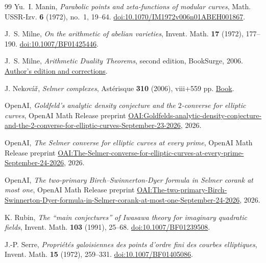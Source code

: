 \begin{thebibliography}{99}
Yu.~I. Manin,
\emph{Parabolic points and zeta-functions of modular curves},
Math. USSR-Izv. \textbf{6} (1972), no.~1, 19--64.
\href{https://doi.org/10.1070/IM1972v006n01ABEH001867}{doi:10.1070/IM1972v006n01ABEH001867}.

J.~S. Milne,
\emph{On the arithmetic of abelian varieties},
Invent. Math. \textbf{17} (1972), 177--190.
\href{https://doi.org/10.1007/BF01425446}{doi:10.1007/BF01425446}.

J.~S. Milne,
\emph{Arithmetic Duality Theorems}, second edition,
BookSurge, 2006.
\href{https://www.jmilne.org/math/Books/adt.html}{Author's edition and corrections}.

J. Nekov\'a\v{r},
\emph{Selmer complexes},
Ast\'erisque \textbf{310} (2006), viii+559 pp.
\href{https://www.numdam.org/item/AST_2006__310__R1_0/}{Book}.

OpenAI,
\emph{Goldfeld's analytic density conjecture and the $2$-converse for elliptic curves},
OpenAI Math Release preprint
\href{https://github.com/openai/math/blob/main/preprints/Goldfelds-analytic-density-conjecture-and-the-2-converse-for-elliptic-curves-September-23-2026/paper.pdf}{OAI:Goldfelds-analytic-density-conjecture-and-the-2-converse-for-elliptic-curves-September-23-2026},
2026.

OpenAI,
\emph{The Selmer converse for elliptic curves at every prime},
OpenAI Math Release preprint
\href{https://github.com/openai/math/blob/main/preprints/The-Selmer-converse-for-elliptic-curves-at-every-prime-September-24-2026/main.pdf}{OAI:The-Selmer-converse-for-elliptic-curves-at-every-prime-September-24-2026},
2026.

OpenAI,
\emph{The two-primary Birch--Swinnerton-Dyer formula in Selmer corank at most one},
OpenAI Math Release preprint
\href{https://github.com/openai/math/blob/main/preprints/The-two-primary-Birch-Swinnerton-Dyer-formula-in-Selmer-corank-at-most-one-September-24-2026/paper.pdf}{OAI:The-two-primary-Birch-Swinnerton-Dyer-formula-in-Selmer-corank-at-most-one-September-24-2026},
2026.

K. Rubin,
\emph{The ``main conjectures'' of Iwasawa theory
for imaginary quadratic fields},
Invent. Math. \textbf{103} (1991), 25--68.
\href{https://doi.org/10.1007/BF01239508}{doi:10.1007/BF01239508}.

J.-P. Serre,
\emph{Propri\'et\'es galoisiennes des points d'ordre fini
des courbes elliptiques},
Invent. Math. \textbf{15} (1972), 259--331.
\href{https://doi.org/10.1007/BF01405086}{doi:10.1007/BF01405086}.


\end{thebibliography}
